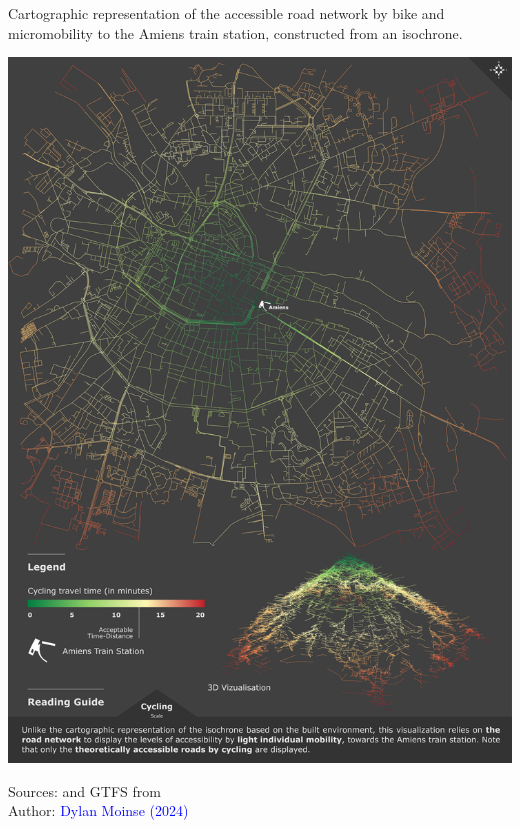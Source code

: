 \begin{refsegment}
\begin{carte}[h!]\vspace*{4pt}
    \caption{Cartographic representation of the accessible road network by bike and micromobility to the Amiens train station, constructed from an isochrone.}
    \label{fig-chap3:isochrone-amiens-voirie}
    \centerline{\includegraphics[width=1\columnwidth]{src/Figures/Chap-3/EN_Carte_Isochrone_Amiens_Voirie.png}}
    \vspace{5pt}
    \begin{flushright}\scriptsize{
    Sources: \textcolor{blue}{\textcite{openstreetmap_openstreetmap_2023}} and \acrshort{GTFS} from \textcolor{blue}{\textcite{sncf_reseau_2024}}
    \\
    Author: \textcolor{blue}{Dylan Moinse (2024)}
    }\end{flushright}
\end{carte}


\end{refsegment}
